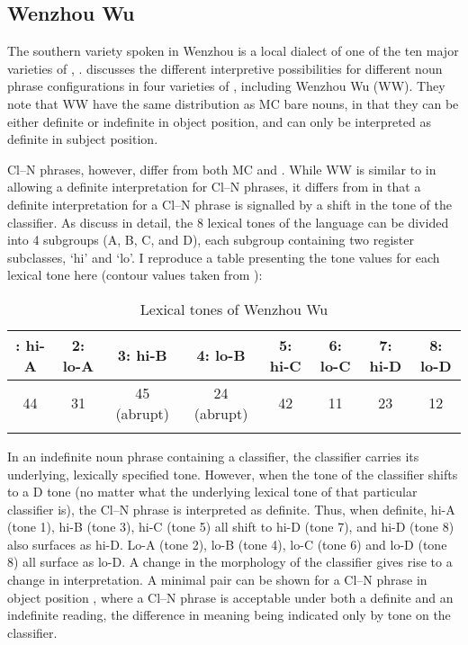\documentclass[output=paper
,modfonts
,nonflat]{langsci/langscibook}
\begin{document}
\subsection{Wenzhou Wu} \label{sec:hall:4.1}

The southern  variety spoken in Wenzhou is a local dialect of one of the ten major varieties of , . \citet{ChengSybesma2005} discusses the different interpretive possibilities for different noun phrase configurations in four varieties of , including Wenzhou Wu (WW). They note that WW  have the same distribution as MC bare nouns, in that they can be either definite or indefinite in object position, and can only be interpreted as definite in subject position.

Cl--N phrases, however, differ from both MC and . While WW is similar to  in allowing a definite interpretation for Cl--N phrases, it differs from  in that a definite interpretation for a Cl--N phrase is signalled by a shift in the tone of the classifier. As \citet{ChengSybesma2005} discuss in detail, the 8 lexical tones of the language can be divided into 4 subgroups (A, B, C, and D), each subgroup containing two register subclasses, `hi' and `lo'. I reproduce a table presenting the tone values for each lexical tone here (contour values taken from \citealt{Norman1988}):

\begin{table}[h] \small
\caption{Lexical tones of Wenzhou Wu}
\begin{tabularx}{\textwidth}{cccccccc}
\lsptoprule
1: hi-A&2: lo-A&3: hi-B&4: lo-B&5: hi-C&6: lo-C&7: hi-D&8: lo-D\\
\midrule
44&31&45 (abrupt)&24 (abrupt)&42&11&23&12\\
\lspbottomrule
\end{tabularx}
\end{table}

In an indefinite noun phrase containing a classifier, the classifier carries its underlying, lexically specified tone. However, when the tone of the classifier shifts to a D tone (no matter what the underlying lexical tone of that particular classifier is), the Cl--N phrase is interpreted as definite. Thus, when definite, hi-A (tone 1), hi-B (tone 3), hi-C (tone 5) all shift to hi-D (tone 7), and hi-D (tone 8) also surfaces as hi-D. Lo-A (tone 2), lo-B (tone 4), lo-C (tone 6) and lo-D (tone 8) all surface as lo-D. A change in the morphology of the classifier gives rise to a change in interpretation. A minimal pair can be shown for a Cl--N phrase in object position , where a Cl--N phrase is acceptable under both a definite and an indefinite reading, the difference in meaning being indicated only by tone on the classifier.
\end{document}
